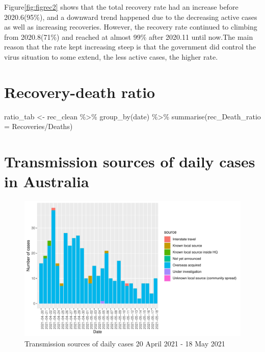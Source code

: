 \documentclass[11pt,a4paper,]{article}
\newenvironment{Shaded}{\begin{snugshade}}{\end{snugshade}}
\newcommand{\AttributeTok}[1]{\textcolor[rgb]{0.77,0.63,0.00}{#1}}
\newcommand{\FunctionTok}[1]{\textcolor[rgb]{0.00,0.00,0.00}{#1}}
\newcommand{\NormalTok}[1]{#1}
\newcommand{\OtherTok}[1]{\textcolor[rgb]{0.56,0.35,0.01}{#1}}
\newcommand{\SpecialCharTok}[1]{\textcolor[rgb]{0.00,0.00,0.00}{#1}}
\begin{document}
Figure\ref{fig:figrec2} shows that the total recovery rate had an increase before 2020.6(95\%), and a downward trend happened due to the decreasing active cases as well as increasing recoveries. However, the recovery rate continued to climbing from 2020.8(71\%) and reached at almost 99\% after 2020.11 until now.The main reason that the rate kept increasing steep is that the government did control the virus situation to some extend, the less active cases, the higher rate.

\hypertarget{recovery-death-ratio}{%
\section{Recovery-death ratio}\label{recovery-death-ratio}}

\begin{Shaded}
\begin{Highlighting}[]
\NormalTok{ratio\_tab }\OtherTok{\textless{}{-}}\NormalTok{ rec\_clean }\SpecialCharTok{\%\textgreater{}\%} 
  \FunctionTok{group\_by}\NormalTok{(date) }\SpecialCharTok{\%\textgreater{}\%} 
  \FunctionTok{summarise}\NormalTok{(}\AttributeTok{rec\_Death\_ratio =}\NormalTok{ Recoveries}\SpecialCharTok{/}\NormalTok{Deaths)}
\end{Highlighting}
\end{Shaded}

\section*{Transmission sources of daily cases in Australia}

\begin{figure}

{\centering \includegraphics{report_files/figure-latex/tra-1} 

}

\caption{Transmission sources of daily cases 20 April 2021 - 18 May 2021}\label{fig:tra}
\end{figure}
\end{document}
